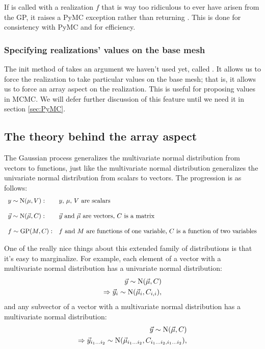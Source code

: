 \documentclass{manual}
\begin{document}
If  is called with a realization $f$ that is way too ridiculous to ever have arisen from the GP, it raises a PyMC  exception rather than returning . This is done for consistency with PyMC and for efficiency.

\subsubsection{Specifying realizations' values on the base mesh}\label{subsub:force}

The init method of  takes an argument we haven't used yet, called . It allows us to force the realization to take particular values on the base mesh; that is, it allows us to force an array aspect on the realization. This is useful for proposing values in MCMC. We will defer further discussion of this feature until we need it in section \ref{sec:PyMC}. 

\subsection{The theory behind the array aspect} 
The Gaussian process generalizes the multivariate normal distribution from vectors to functions, just like the multivariate normal distribution generalizes the univariate normal distribution from scalars to vectors. The progression is as follows:
\begin{equation}
    \begin{array}{ll}
        y\sim\textup N(\mu,V): & \textup{$y$, $\mu$, $V$ are scalars}\\\\
        \vec y\sim\textup N(\vec \mu,C): & \textup{$\vec y$ and $\vec \mu$ are vectors, $C$ is a matrix}\\\\
        f\sim\textup{GP}(M, C): & \textup{$f$ and $M$ are functions of one variable, $C$ is a function of two variables}
    \end{array}
\end{equation}

One of the really nice things about this extended family of distributions is that it's easy to marginalize. For example, each element of a vector with a multivariate normal distribution has a univariate normal distribution:
\begin{eqnarray*}
    \vec y\sim\textup N(\vec \mu,C)\\
	\Rightarrow \vec y_i\sim\textup N(\vec \mu_i,C_{i,i}),
\end{eqnarray*}
and any subvector of a vector with a multivariate normal distribution has a multivariate normal distribution:
\begin{eqnarray*}
    \vec y\sim\textup N(\vec \mu,C)\\
	\Rightarrow \vec y_{i_1\ldots i_2}\sim\textup N(\vec \mu_{i_1\ldots i_2},C_{i_1\ldots i_2,i_1\ldots i_2}),
\end{eqnarray*}
\end{document}
